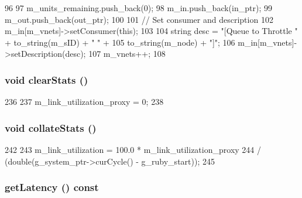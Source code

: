 \begin{DoxyCode}
96 {
97     m_units_remaining.push_back(0);
98     m_in.push_back(in_ptr);
99     m_out.push_back(out_ptr);
100 
101     // Set consumer and description
102     m_in[m_vnets]->setConsumer(this);
103 
104     string desc = "[Queue to Throttle " + to_string(m_sID) + " " +
105         to_string(m_node) + "]";
106     m_in[m_vnets]->setDescription(desc);
107     m_vnets++;
108 }
\end{DoxyCode}
\hypertarget{classThrottle_ac7ec7476159db4e2bb0372e30010fc9e}{
\subsubsection[{clearStats}]{\setlength{\rightskip}{0pt plus 5cm}void clearStats ()}}
\label{classThrottle_ac7ec7476159db4e2bb0372e30010fc9e}



\begin{DoxyCode}
236 {
237     m_link_utilization_proxy = 0;
238 }
\end{DoxyCode}
\hypertarget{classThrottle_a208669cbc0bb1d52565956ca8c690c55}{
\subsubsection[{collateStats}]{\setlength{\rightskip}{0pt plus 5cm}void collateStats ()}}
\label{classThrottle_a208669cbc0bb1d52565956ca8c690c55}



\begin{DoxyCode}
242 {
243     m_link_utilization = 100.0 * m_link_utilization_proxy
244         / (double(g_system_ptr->curCycle() - g_ruby_start));
245 }
\end{DoxyCode}
\hypertarget{classThrottle_ae69a59f28f0cfd099bf798cb6bb76356}{
\subsubsection[{getLatency}]{ getLatency () const}}
\label{classThrottle_ae69a59f28f0cfd099bf798cb6bb76356}



